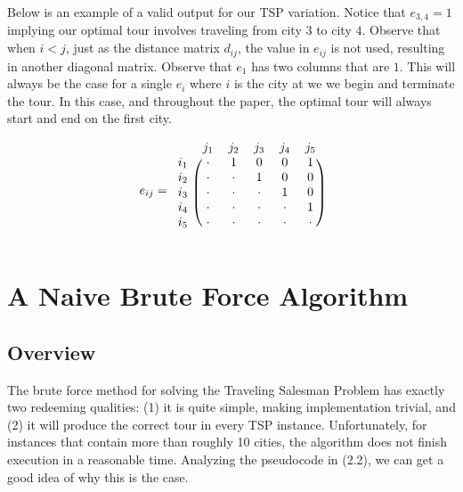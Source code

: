 \documentclass[11pt,fleqn]{article}
\begin{document}
Below is an example of a valid output for our TSP variation.  Notice that
$e_{3,4}=1$ implying our optimal tour involves traveling from city $3$ to
city $4$.  Observe that when $i<j$, just as the distance matrix $d_{ij}$,
the value in $e_{ij}$ is not used, resulting in another diagonal matrix.
Observe that $e_1$ has two columns that are $1$.  This will always be the
case for a single $e_i$ where $i$ is the city at we we begin and terminate
the tour.  In this case, and throughout the paper, the optimal tour will
always start and end on the first city.
\par

\begin{align*}
  e_{ij}=
  \begin{blockarray}{cccccc}
    & j_1 & j_2 & j_3 & j_4 & j_5 \\
  \begin{block}{c(ccccc)}
    i_1 & \cdot & 1 & 0 & 0 & 1 \\
    i_2 & \cdot & \cdot & 1 & 0 & 0 \\
    i_3 & \cdot & \cdot & \cdot & 1 & 0 \\
    i_4 & \cdot & \cdot & \cdot & \cdot & 1 \\
    i_5 & \cdot & \cdot & \cdot & \cdot & \cdot \\
  \end{block}
  \end{blockarray}
\end{align*}


\section{A Naive Brute Force Algorithm}
\subsection{Overview}
The brute force method for solving the Traveling Salesman Problem has exactly
two redeeming qualities: (1) it is quite simple, making implementation
trivial, and (2) it will produce the correct tour in every TSP instance.
Unfortunately, for instances that contain more than roughly 10 cities, the
algorithm does not finish execution in a reasonable time.  Analyzing the
pseudocode in (2.2), we can get a good idea of why this is the case.
\par
\vspace{0.5cm}
\end{document}
